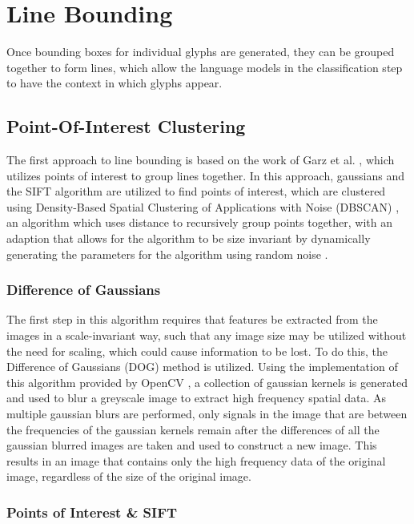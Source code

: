 \section{Line Bounding}

Once bounding boxes for individual glyphs are generated, they can be grouped together to form lines, which allow the language models in the classification step to have the context in which glyphs appear.

\subsection{Point-Of-Interest Clustering}

The first approach to line bounding is based on the work of Garz et al. \cite{Garz2011, Garz2012}, which utilizes points of interest to group lines together. In this approach, gaussians and the SIFT algorithm are utilized to find points of interest, which are clustered using Density-Based Spatial Clustering of Applications with Noise (DBSCAN) \cite{Ester}, an algorithm which uses distance to recursively group points together, with an adaption that allows for the algorithm to be size invariant by dynamically generating the parameters for the algorithm using random noise \cite{Daszykowski}.

\subsubsection{Difference of Gaussians}

The first step in this algorithm requires that features be extracted from the images in a scale-invariant way, such that any image size may be utilized without the need for scaling, which could cause information to be lost. To do this, the Difference of Gaussians (DOG) method is utilized. Using the implementation of this algorithm provided by OpenCV \cite{OpenCV}, a collection of gaussian kernels is generated and used to blur a greyscale image to extract high frequency spatial data. As multiple gaussian blurs are performed, only signals in the image that are between the frequencies of the gaussian kernels remain after the differences of all the gaussian blurred images are taken and used to construct a new image. This results in an image that contains only the high frequency data of the original image, regardless of the size of the original image.

\subsubsection{Points of Interest \& SIFT}

